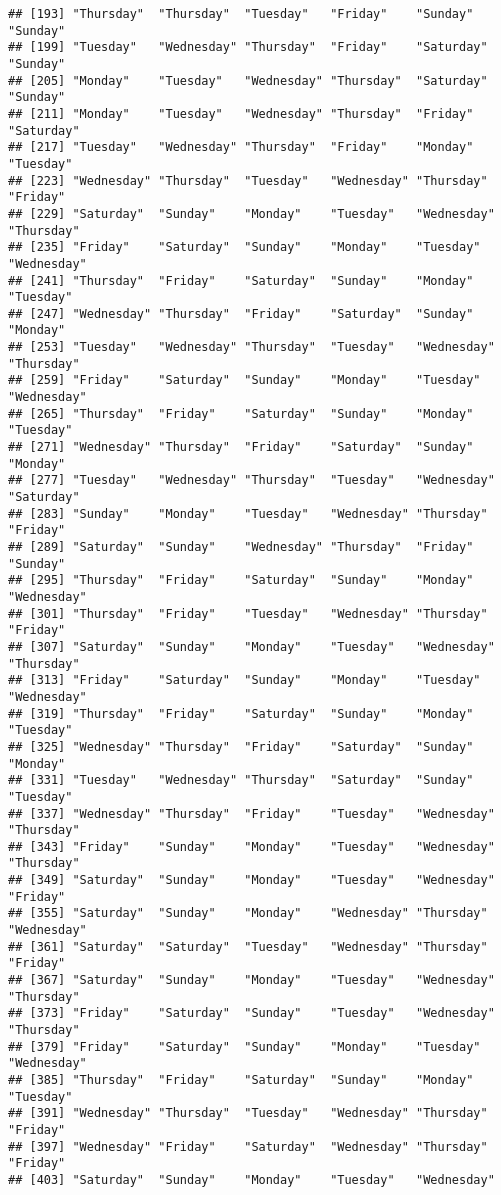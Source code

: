 \documentclass[
]{article}
\begin{document}
\begin{verbatim}
## [193] "Thursday"  "Thursday"  "Tuesday"   "Friday"    "Sunday"    "Sunday"   
## [199] "Tuesday"   "Wednesday" "Thursday"  "Friday"    "Saturday"  "Sunday"   
## [205] "Monday"    "Tuesday"   "Wednesday" "Thursday"  "Saturday"  "Sunday"   
## [211] "Monday"    "Tuesday"   "Wednesday" "Thursday"  "Friday"    "Saturday" 
## [217] "Tuesday"   "Wednesday" "Thursday"  "Friday"    "Monday"    "Tuesday"  
## [223] "Wednesday" "Thursday"  "Tuesday"   "Wednesday" "Thursday"  "Friday"   
## [229] "Saturday"  "Sunday"    "Monday"    "Tuesday"   "Wednesday" "Thursday" 
## [235] "Friday"    "Saturday"  "Sunday"    "Monday"    "Tuesday"   "Wednesday"
## [241] "Thursday"  "Friday"    "Saturday"  "Sunday"    "Monday"    "Tuesday"  
## [247] "Wednesday" "Thursday"  "Friday"    "Saturday"  "Sunday"    "Monday"   
## [253] "Tuesday"   "Wednesday" "Thursday"  "Tuesday"   "Wednesday" "Thursday" 
## [259] "Friday"    "Saturday"  "Sunday"    "Monday"    "Tuesday"   "Wednesday"
## [265] "Thursday"  "Friday"    "Saturday"  "Sunday"    "Monday"    "Tuesday"  
## [271] "Wednesday" "Thursday"  "Friday"    "Saturday"  "Sunday"    "Monday"   
## [277] "Tuesday"   "Wednesday" "Thursday"  "Tuesday"   "Wednesday" "Saturday" 
## [283] "Sunday"    "Monday"    "Tuesday"   "Wednesday" "Thursday"  "Friday"   
## [289] "Saturday"  "Sunday"    "Wednesday" "Thursday"  "Friday"    "Sunday"   
## [295] "Thursday"  "Friday"    "Saturday"  "Sunday"    "Monday"    "Wednesday"
## [301] "Thursday"  "Friday"    "Tuesday"   "Wednesday" "Thursday"  "Friday"   
## [307] "Saturday"  "Sunday"    "Monday"    "Tuesday"   "Wednesday" "Thursday" 
## [313] "Friday"    "Saturday"  "Sunday"    "Monday"    "Tuesday"   "Wednesday"
## [319] "Thursday"  "Friday"    "Saturday"  "Sunday"    "Monday"    "Tuesday"  
## [325] "Wednesday" "Thursday"  "Friday"    "Saturday"  "Sunday"    "Monday"   
## [331] "Tuesday"   "Wednesday" "Thursday"  "Saturday"  "Sunday"    "Tuesday"  
## [337] "Wednesday" "Thursday"  "Friday"    "Tuesday"   "Wednesday" "Thursday" 
## [343] "Friday"    "Sunday"    "Monday"    "Tuesday"   "Wednesday" "Thursday" 
## [349] "Saturday"  "Sunday"    "Monday"    "Tuesday"   "Wednesday" "Friday"   
## [355] "Saturday"  "Sunday"    "Monday"    "Wednesday" "Thursday"  "Wednesday"
## [361] "Saturday"  "Saturday"  "Tuesday"   "Wednesday" "Thursday"  "Friday"   
## [367] "Saturday"  "Sunday"    "Monday"    "Tuesday"   "Wednesday" "Thursday" 
## [373] "Friday"    "Saturday"  "Sunday"    "Tuesday"   "Wednesday" "Thursday" 
## [379] "Friday"    "Saturday"  "Sunday"    "Monday"    "Tuesday"   "Wednesday"
## [385] "Thursday"  "Friday"    "Saturday"  "Sunday"    "Monday"    "Tuesday"  
## [391] "Wednesday" "Thursday"  "Tuesday"   "Wednesday" "Thursday"  "Friday"   
## [397] "Wednesday" "Friday"    "Saturday"  "Wednesday" "Thursday"  "Friday"   
## [403] "Saturday"  "Sunday"    "Monday"    "Tuesday"   "Wednesday"
\end{verbatim}
\end{document}
